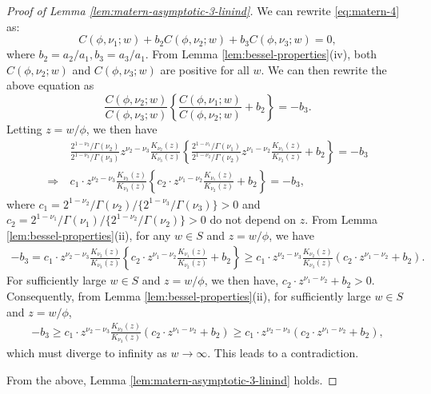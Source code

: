 \documentclass[11pt]{article}
\theoremstyle{definition}
\theoremstyle{remark}
\begin{document}
\begin{proof}[Proof of Lemma \ref{lem:matern-asymptotic-3-linind}]
We can rewrite \eqref{eq:matern-4} as:
\[
C(\phi, \nu_1; w)  + b_2 C(\phi, \nu_2; w)  + b_3 C(\phi, \nu_3; w)  = 0,
\] 
where $b_2 = a_2/a_1, b_3=a_3/a_1$.
From Lemma \ref{lem:bessel-properties}(iv), both $C(\phi, \nu_2; w)$ and $C(\phi, \nu_3; w)$ are positive for all $w$.  We can then rewrite the above equation as 
\begin{equation}\label{eq:matern-expression}
\frac{C(\phi, \nu_2; w) }{C(\phi, \nu_3; w) } 
\left\{ \frac{C(\phi, \nu_1; w) }{C(\phi, \nu_2; w) } + b_2 \right\}  = -b_3.
\end{equation} 
Letting $z = w/\phi$, we then have 
\begin{align*}
    & \frac{2^{1-\nu_2}/\Gamma(\nu_2)}{2^{1-\nu_3}/\Gamma(\nu_3)}z^{\nu_2-\nu_3} \frac{K_{\nu_2}(z)}{K_{\nu_3}(z)}
\left\{ \frac{2^{1-\nu_1}/\Gamma(\nu_1)}{2^{1-\nu_2}/\Gamma(\nu_2)}z^{\nu_1-\nu_2} \frac{K_{\nu_1}(z)}{K_{\nu_2}(z)} + b_2 \right\}  = -b_3\\
\Longrightarrow \  &
c_1 \cdot z^{\nu_2-\nu_3} \frac{K_{\nu_2}(z)}{K_{\nu_3}(z)}
\left\{ c_2 \cdot z^{\nu_1-\nu_2} \frac{K_{\nu_1}(z)}{K_{\nu_2}(z)} + b_2 \right\}  = -b_3, 
\end{align*}
where $c_1 = {2^{1-\nu_2}/\Gamma(\nu_2)}/\{2^{1-\nu_3}/\Gamma(\nu_3)\}>0$ and 
$c_2 = {2^{1-\nu_1}/\Gamma(\nu_1)}/\{2^{1-\nu_2}/\Gamma(\nu_2)\}>0$ do not depend on $z$. 
From Lemma \ref{lem:bessel-properties}(ii), for any $w\in S$ and $z=w/\phi$, we have 
\begin{align*}
    -b_3 = c_1 \cdot z^{\nu_2-\nu_3} \frac{K_{\nu_2}(z)}{K_{\nu_3}(z)}
\left\{ c_2 \cdot z^{\nu_1-\nu_2} \frac{K_{\nu_1}(z)}{K_{\nu_2}(z)} + b_2 \right\}  
\ge c_1 \cdot z^{\nu_2-\nu_3} \frac{K_{\nu_2}(z)}{K_{\nu_3}(z)}
\left( c_2 \cdot z^{\nu_1-\nu_2} + b_2 \right).   
\end{align*}
For sufficiently large $w\in S$ and $z=w/\phi$, we then have, $c_2 \cdot z^{\nu_1-\nu_2} + b_2>0$. Consequently, from Lemma \ref{lem:bessel-properties}(ii), for sufficiently large $w\in S$ and $z=w/\phi$, 
\begin{align*}
    -b_3 \ge c_1 \cdot z^{\nu_2-\nu_3} \frac{K_{\nu_2}(z)}{K_{\nu_3}(z)}
\left( c_2 \cdot z^{\nu_1-\nu_2} + b_2 \right)
\ge  c_1 \cdot z^{\nu_2-\nu_3}
\left( c_2 \cdot z^{\nu_1-\nu_2} + b_2 \right), 
\end{align*}
which must diverge to infinity as $w\rightarrow \infty$. This leads to a contradiction. 

From the above, Lemma \ref{lem:matern-asymptotic-3-linind} holds.
\end{proof}
\end{document}
